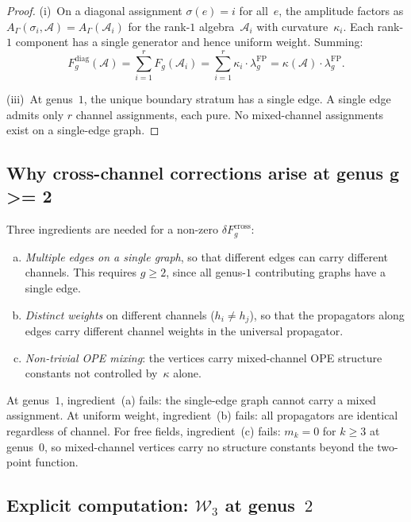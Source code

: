 \documentclass[11pt,reqno]{amsart}
\theoremstyle{definition}
\theoremstyle{remark}
\newcommand{\cA}{\mathcal{A}}
\newcommand{\cW}{\mathcal{W}}
\numberwithin{equation}{section}
\begin{document}
\begin{proof}
(i)~On a diagonal assignment $\sigma(e) = i$ for all~$e$,
the amplitude factors as $A_\Gamma(\sigma_i,\cA)
= A_\Gamma(\cA_i)$ for the rank-$1$ algebra~$\cA_i$ with
curvature~$\kappa_i$. Each rank-$1$ component has a single
generator and hence uniform weight. Summing:
\[
F_g^{\mathrm{diag}}(\cA) = \sum_{i=1}^r F_g(\cA_i)
= \sum_{i=1}^r \kappa_i\cdot\lambda_g^{\mathrm{FP}}
= \kappa(\cA)\cdot\lambda_g^{\mathrm{FP}}.
\]

\smallskip\noindent
(iii)~At genus~$1$, the unique boundary stratum has a single
edge. A single edge admits only $r$ channel assignments,
each pure. No mixed-channel assignments exist on a
single-edge graph.
\end{proof}

\subsection{Why cross-channel corrections arise at genus g >= 2}\label{subsec:why-cross}

Three ingredients are needed for a non-zero
$\delta F_g^{\mathrm{cross}}$:
\begin{enumerate}[(a)]
\item \emph{Multiple edges on a single graph}, so that
 different edges can carry different channels. This
 requires $g \ge 2$, since all genus-$1$ contributing graphs
 have a single edge.

\item \emph{Distinct weights} on different channels
 ($h_i \neq h_j$), so that the propagators along edges
 carry different channel weights in the universal propagator.

\item \emph{Non-trivial OPE mixing}: the vertices carry
 mixed-channel OPE structure constants not controlled
 by~$\kappa$ alone.
\end{enumerate}

At genus~$1$, ingredient~(a) fails: the single-edge graph
cannot carry a mixed assignment.
At uniform weight, ingredient~(b) fails: all propagators are
identical regardless of channel.
For free fields, ingredient~(c) fails: $m_k = 0$ for
$k \ge 3$ at genus~$0$, so mixed-channel vertices carry no
structure constants beyond the two-point function.

\subsection{Explicit computation: $\cW_3$ at genus~$2$}
\label{subsec:w3-genus2}
\end{document}

